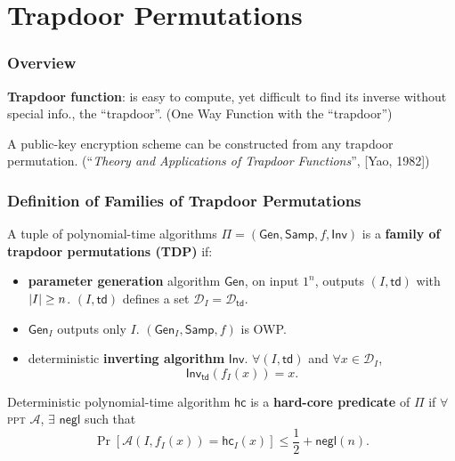 \section{Trapdoor Permutations}
\begin{frame}\frametitle{Overview}
\textbf{Trapdoor function}: is easy to compute, yet difficult to find its inverse without special info., the ``trapdoor''. (One Way Function with the ``trapdoor'')
\newline

A public-key encryption scheme can be constructed from any trapdoor permutation. (``\emph{Theory and Applications of Trapdoor Functions}'', [Yao, 1982])
\begin{figure}
\begin{center}

\end{center}
\end{figure}
\end{frame}
\begin{frame}\frametitle{Definition of Families of Trapdoor Permutations}
A tuple of polynomial-time algorithms $\Pi = (\mathsf{Gen}, \mathsf{Samp}, f, \mathsf{Inv})$ is a \textbf{family of trapdoor permutations (TDP)} if:
\begin{itemize}
\item \textbf{parameter generation} algorithm $\mathsf{Gen}$, on input $1^n$, outputs $(I,\mathsf{td})$ with $\lvert I\rvert \ge n$. $(I, \mathsf{td})$ defines a set $\mathcal{D}_I = \mathcal{D}_{\mathsf{td}}$.
\item $\mathsf{Gen}_I$ outputs only $I$.
$(\mathsf{Gen}_I, \mathsf{Samp}, f)$ is OWP.
\item deterministic \textbf{inverting algorithm} $\mathsf{Inv}$. $\forall (I,\mathsf{td})$ and $\forall x \in \mathcal{D}_{I}$, 
\[ \mathsf{Inv}_{\mathsf{td}}(f_I(x))=x.\]
\end{itemize}
Deterministic polynomial-time algorithm $\mathsf{hc}$ is a \textbf{hard-core predicate} of $\Pi$ if $\forall$ \textsc{ppt} $\mathcal{A}$, $\exists$ $\mathsf{negl}$ such that
\[ \Pr[\mathcal{A}(I,f_I(x)) = \mathsf{hc}_I(x)] \le \frac{1}{2} +\mathsf{negl}(n). \]
\end{frame}
